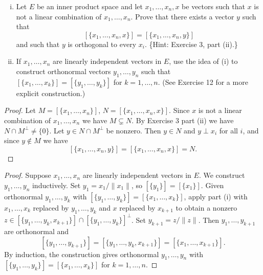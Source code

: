 \begin{tcolorbox}[title=Problem 8, breakable]
\begin{enumerate}[(i)]
    \item Let $E$ be an inner product space and let $x_1, \ldots, x_n, x$ be vectors such that $x$ is not a linear combination of $x_1, \ldots, x_n$. Prove that there exists a vector $y$ such that
    \[
        [\{x_1, \ldots, x_n, x\}] = [\{x_1, \ldots, x_n, y\}]
    \]
    and such that $y$ is orthogonal to every $x_i$. \{Hint: Exercise 3, part (ii).\}

    \item If $x_1, \ldots, x_n$ are linearly independent vectors in $E$, use the idea of (i) to construct orthonormal vectors $y_1, \ldots, y_n$ such that $[\{x_1, \ldots, x_k\}] = [\{y_1, \ldots, y_k\}]$ for $k = 1, \ldots, n$. (See Exercise 12 for a more explicit construction.)
\end{enumerate}
\end{tcolorbox}

\begin{proof}
    Let $M = [\{x_1, \ldots, x_n\}]$, $N = [\{x_1, \ldots, x_n, x\}]$.
    Since $x$ is not a linear combination of $x_1, \ldots, x_n$ we have $M \subsetneq N$.
    By Exercise 3 part (ii) we have $N \cap M^\perp \ne \{0\}$.
    Let $y \in N \cap M^\perp$ be nonzero. Then $y \in N$ and $y \perp x_i$ for all $i$, and since $y \notin M$ we have
    \[[\{x_1, \ldots, x_n, y\}] = [\{x_1, \ldots, x_n, x\}] = N.\]
\end{proof}
\begin{proof}
    Suppose $x_1, \ldots, x_n$ are linearly independent vectors in $E$.
    We construct $y_1, \ldots, y_n$ inductively.
    Set $y_1 = x_1 / \|x_1\|$, so $[\{y_1\}] = [\{x_1\}]$.
    Given orthonormal $y_1, \ldots, y_k$ with $[\{y_1, \ldots, y_k\}] = [\{x_1, \ldots, x_k\}]$,
    apply part (i) with $x_1, \ldots, x_k$ replaced by $y_1, \ldots, y_k$ and $x$ replaced by $x_{k+1}$
    to obtain a nonzero $z \in [\{y_1, \ldots, y_k, x_{k+1}\}] \cap [\{y_1, \ldots, y_k\}]^\perp$.
    Set $y_{k+1} = z / \|z\|$. Then $y_1, \ldots, y_{k+1}$ are orthonormal and
    \[[\{y_1, \ldots, y_{k+1}\}] = [\{y_1, \ldots, y_k, x_{k+1}\}] = [\{x_1, \ldots, x_{k+1}\}].\]
    By induction, the construction gives orthonormal $y_1, \ldots, y_n$ with $[\{y_1, \ldots, y_k\}] = [\{x_1, \ldots, x_k\}]$ for $k = 1, \ldots, n$.
\end{proof}

